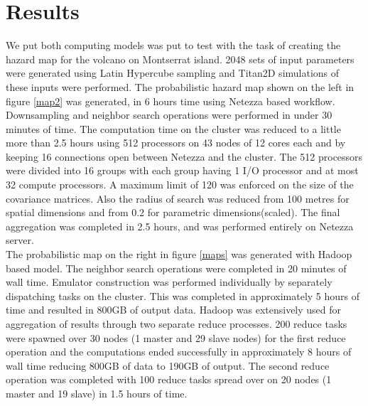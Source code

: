 \documentclass{acm_proc_article-sp}
\begin{document}
\section{Results}
We put both computing models was put to test with the task of creating the hazard map for the volcano on Montserrat island. 
2048 sets of input parameters were generated using Latin Hypercube sampling and Titan2D simulations of these inputs were performed. 
The probabilistic hazard map shown on the left in figure \ref{map2} was generated, 
in 6 hours time using Netezza based workflow.
Downsampling and neighbor search operations were performed in under 30 minutes of time.
The computation time on the cluster was
reduced to a little more than 2.5 hours using 512 processors on 43 nodes of 12 cores each and by keeping 16 connections open between Netezza
and the cluster. The 512 processors were divided into 16 groups with each group having 1 I/O processor and at most 32 compute processors.
A maximum limit of 120 was enforced on the size of the covariance matrices.
Also the radius of search was reduced from 100 metres for spatial dimensions and from 0.2 for parametric dimensions(scaled).
The final aggregation was completed in 2.5 hours, and was performed entirely on Netezza server.\\

The probabilistic map on the right in figure \ref{maps} 
was generated with Hadoop based model. The  neighbor search operations were completed in 20 minutes of 
wall time. Emulator construction was performed individually by separately dispatching tasks on the cluster. This was completed in approximately 5
hours of time and resulted in 800GB of output data. Hadoop was extensively used for aggregation of results through two separate reduce processes.
200 reduce tasks were spawned over 30 nodes (1 master and 29 slave nodes) for the first reduce operation and the computations ended successfully
in approximately 8 hours of wall time reducing 800GB of data to 190GB of output. The second reduce operation was completed with 100 reduce tasks 
spread over on 20 nodes (1 master and 19 slave) in 1.5 hours of time.
\end{document}
